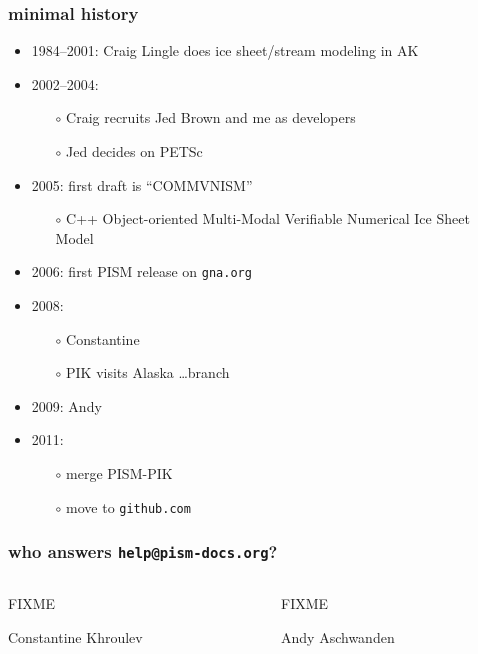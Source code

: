 \documentclass[hide notes,intlimits]{beamer}
\begin{document}
\begin{frame}
  \frametitle{minimal history}
  \begin{itemize}
  \item 1984--2001: Craig Lingle does ice sheet/stream modeling in AK
  \item 2002--2004:
    \begin{itemize}
    \item[$\circ$] Craig recruits Jed Brown and me as developers
    \item[$\circ$] Jed decides on PETSc
    \end{itemize}
  \item 2005: first draft is ``COMMVNISM''
    \begin{itemize}
    \scriptsize
    \item[$\circ$] \alert{C++ Object-oriented Multi-Modal Verifiable Numerical Ice Sheet Model}
    \normalsize
    \end{itemize}
  \item 2006: first PISM release on \texttt{gna.org}
  \item 2008:
    \begin{itemize}
    \item[$\circ$] Constantine
    \item[$\circ$] PIK visits Alaska \dots branch
    \end{itemize}
  \item 2009: Andy
  \item 2011:
    \begin{itemize}
    \item[$\circ$] merge PISM-PIK
    \item[$\circ$] move to \texttt{github.com}
    \end{itemize}
  \end{itemize}
\end{frame}


\begin{frame}
  \frametitle{who answers \texttt{help@pism-docs.org}?}
  \begin{columns}
    \begin{column}{0.5\textwidth}
      \begin{center}
      FIXME
      
      Constantine Khroulev
      \end{center}
    \end{column}
    \begin{column}{0.5\textwidth}
      \begin{center}
      FIXME
      
      Andy Aschwanden
      \end{center}
    \end{column}
  \end{columns}

\end{frame}
\end{document}
